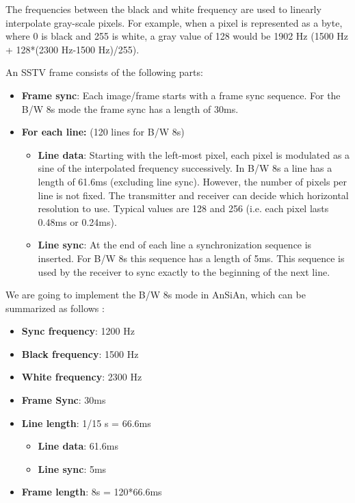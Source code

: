 The frequencies between the black and white frequency are used to linearly interpolate gray-scale pixels. For example, when a pixel is represented as a byte, where 0 is black and 255 is white, a gray value of 128 would be 1902 Hz (1500 Hz + 128*(2300 Hz-1500 Hz)/255). 

An SSTV frame consists of the following parts:
\begin{itemize}
	\item \textbf{Frame sync}: Each image/frame starts with a frame sync sequence. For the B/W 8s mode the frame sync has a length of 30ms. 
	\item \textbf{For each line:} (120 lines for B/W 8s)
	\begin{itemize}
		\item \textbf{Line data}: Starting with the left-most pixel, each pixel is modulated as a sine of the interpolated frequency successively. In B/W 8s a line has a length of 61.6ms (excluding line sync). However, the number of pixels per line is not fixed. The transmitter and receiver can decide which horizontal resolution to use. Typical values are 128 and 256 (i.e. each pixel lasts 0.48ms or 0.24ms). 
		\item \textbf{Line sync}: At the end of each line a synchronization sequence is inserted. For B/W 8s this sequence has a length of 5ms. This sequence is used by the receiver to sync exactly to the beginning of the next line.
	\end{itemize}
\end{itemize}


We are going to implement the B/W 8s mode in AnSiAn, which can be summarized as follows \cite{pritchard2016newnes}:
\begin{itemize}
	\item \textbf{Sync frequency}: 1200 Hz
	\item \textbf{Black frequency}: 1500 Hz
	\item \textbf{White frequency}: 2300 Hz
	\item \textbf{Frame Sync}: 30ms
	\item \textbf{Line length}: 1/15 s = 66.6ms
	\begin{itemize}
		\item \textbf{Line data}: 61.6ms
		\item \textbf{Line sync}: 5ms
	\end{itemize}

	\item \textbf{Frame length}: 8s = 120*66.6ms
\end{itemize}


